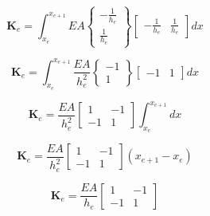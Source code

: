         \begin{equation*}
            \mathbf{K}_e = \int_{x_e}^{x_{e+1}} EA 
            \begin{Bmatrix}
            -\frac{1}{h_e}\\
            \frac{1}{h_e}
            \end{Bmatrix}
            \begin{bmatrix}
            -\frac{1}{h_e} &
            \frac{1}{h_e}
            \end{bmatrix} dx
        \end{equation*}

        \begin{equation*}
            \mathbf{K}_e = \int_{x_e}^{x_{e+1}} \frac{EA}{h_e^2} 
            \begin{Bmatrix}
            -1\\
            1
            \end{Bmatrix}
            \begin{bmatrix}
            -1 &
            1
            \end{bmatrix} dx
        \end{equation*}

        \begin{equation*}
            \mathbf{K}_e = 
            \frac{EA}{h_e^2}\begin{bmatrix}
                1 & -1\\
                -1 & 1
            \end{bmatrix}
            \int_{x_e}^{x_{e+1}} dx
        \end{equation*}

        \begin{equation*}
            \mathbf{K}_e = 
            \frac{EA}{h_e^2}\begin{bmatrix}
                1 & -1\\
                -1 & 1
            \end{bmatrix}
            \left(x_{e+1} - x_e\right)
        \end{equation*}


        \begin{equation}
            \mathbf{K}_e = 
            \frac{EA}{h_e}\begin{bmatrix}
                1 & -1\\
                -1 & 1
            \end{bmatrix}
        \end{equation}

